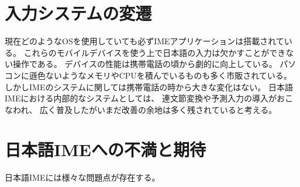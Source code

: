 \section{入力システムの変遷}
現在どのようなOSを使用していても必ずIMEアプリケーションは搭載されている。
これらのモバイルデバイスを使う上で日本語の入力は欠かすことができない操作である。
デバイスの性能は携帯電話の頃から劇的に向上している。
パソコンに遜色ないようなメモリやCPUを積んでいるものも多く市販されている。
しかしIMEのシステムに関しては携帯電話の時から大きな変化はない。
日本語IMEにおける内部的なシステムとしては、
連文節変換や予測入力\cite{pobox}の導入がおこなわれ、
広く普及したがいまだ改善の余地は多く残されていると考える。

\section{日本語IMEへの不満と期待}
日本語IMEには様々な問題点が存在する。

